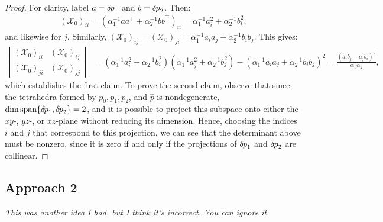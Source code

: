 \documentclass{article}
\begin{document}
\begin{proof}
  For clarity, label $a = {\delta \hspace{-0.08em} p}_1$ and $b = {\delta \hspace{-0.08em} p}_2$. Then:
  \begin{align*}
    {(\mathcal{X}_0)}_{ii} = {(\alpha_1^{-1} aa^\top + \alpha_2^{-1} bb^\top)}_{ii} = \alpha_1^{-1} a_i^2 + \alpha_2^{-1} b_i^2,
  \end{align*}
  and likewise for $j$. Similarly,
  ${(\mathcal{X}_0)}_{ij} = {(\mathcal{X}_0)}_{ji} = \alpha_1^{-1} a_i
  a_j + \alpha_2^{-1} b_i b_j$. This gives:
  \begin{align*}
    \left|\begin{matrix}
      {(\mathcal{X}_0)}_{ii} & {(\mathcal{X}_0)}_{ij} \\
      {(\mathcal{X}_0)}_{ji} & {(\mathcal{X}_0)}_{jj}
    \end{matrix}\right| &= {(\alpha_1^{-1} a_i^2 + \alpha_2^{-1} b_i^2)}{(\alpha_1^{-1} a_j^2 + \alpha_2^{-1} b_j^2)} - {(\alpha_1^{-1} a_ia_j + \alpha_2^{-1} b_ib_j)}^2 = \frac{{(a_ib_j - a_jb_i)}^2}{\alpha_1 \alpha_2},
  \end{align*}
  which establishes the first claim. To prove the second claim,
  observe that since the tetrahedra formed by $p_0, p_1, p_2$, and
  $\hat{p}$ is nondegenerate,
  $\dim \operatorname{span}\{{\delta \hspace{-0.08em} p}_1, {\delta \hspace{-0.08em} p}_2\} = 2$, and it is
  possible to project this subspace onto either the $xy$-, $yz$-, or
  $xz$-plane without reducing its dimension. Hence, choosing the
  indices $i$ and $j$ that correspond to this projection, we can see
  that the determinant above must be nonzero, since it is zero if and
  only if the projections of ${\delta \hspace{-0.08em} p}_1$ and ${\delta \hspace{-0.08em} p}_2$ are
  collinear.
\end{proof}

\subsection*{Approach 2}

\noindent \emph{This was another idea I had, but I think it's incorrect. You can ignore it.} \\
\end{document}

